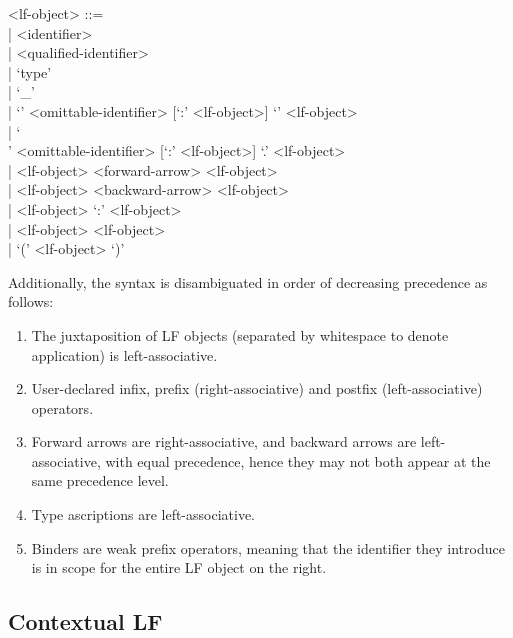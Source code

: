 \documentclass[11pt]{article}
\newcommand{\LF}{\textsc{LF}\xspace}
\begin{document}
\begin{grammar}
<lf-object> ::= \hfill\\
| <identifier>\\
| <qualified-identifier>\\
| `type'\\
| `_'\\
| `{' <omittable-identifier> [`:' <lf-object>] `}' <lf-object>\\
| `\\' <omittable-identifier> [`:' <lf-object>] `.' <lf-object>\\
| <lf-object> <forward-arrow> <lf-object>\\
| <lf-object> <backward-arrow> <lf-object>\\
| <lf-object> `:' <lf-object>\\
| <lf-object> <lf-object>\\
| `(' <lf-object> `)'
\end{grammar}

Additionally, the syntax is disambiguated in order of decreasing precedence as follows:

\begin{enumerate}
\item The juxtaposition of \LF objects (separated by whitespace to denote application) is left-associative.
\item User-declared infix, prefix (right-associative) and postfix (left-associative) operators.
\item Forward arrows are right-associative, and backward arrows are left-associative, with equal precedence, hence they may not both appear at the same precedence level.
\item Type ascriptions are left-associative.
\item Binders are weak prefix operators, meaning that the identifier they introduce is in scope for the entire \LF object on the right.
\end{enumerate}

\subsection{Contextual LF}
\end{document}
